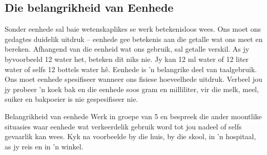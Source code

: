 \subsection*{Die belangrikheid van Eenhede}
            \nopagebreak
Sonder eenhede sal baie wetenskaplikes se werk betekenisloos wees. Ons moet ons gedagtes duidelik uitdruk – eenhede gee betekenis aan die getalle wat ons meet en bereken. Afhangend van die eenheid wat ons gebruik, sal getalle verskil. As jy byvoorbeeld 12 water het, beteken dit niks nie. Jy kan 12 ml water of 12 liter water of selfs 12 bottels water hê. Eenhede is  'n belangrike deel van taalgebruik. Ons moet eenhede spesifiseer wanneer ons fisiese hoeveelhede uitdruk. Verbeel jou jy probeer  'n koek bak en die eenhede soos gram en milliliter, vir die melk, meel, suiker en bakpoeier is nie gespesifiseer nie.
\begin{groupdiscussion}{Belangrikheid van eenhede}
            \nopagebreak
Werk in groepe van 5 en bespreek die ander moontlike situasies waar eenhede wat verkeerdelik gebruik word tot jou nadeel of selfs gevaarlik kan wees. Kyk na voorbeelde by die huis, by die skool, in  'n hospitaal, as jy reis en in  'n winkel.
\end{groupdiscussion}
